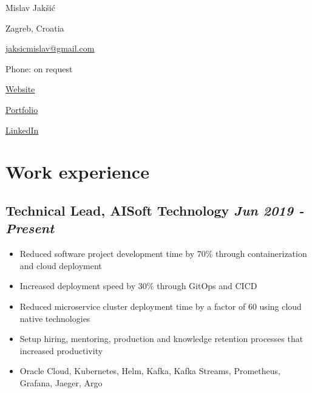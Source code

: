 \documentclass[a4paper]{article}
\newcommand{\bolditalicpair}
[2]
{\textbf{#1} \texorpdfstring{\hfill}{} \textit{#2}}
\begin{document}
\begin{multicols}{3}

\noindent
\begin{minipage}{.22\textwidth}
\raggedright

{\huge Mislav Jakšić}

Zagreb, Croatia
\end{minipage}

\noindent
\begin{minipage}{.50\textwidth}
\raggedleft

\href{mailto:jaksicmislav@gmail.com}{jaksicmislav@gmail.com}

Phone: on request

\end{minipage}

\noindent
\begin{minipage}{.32\textwidth}
\raggedleft

\href{https://mislav-jaksic.from.hr/}{Website}

\href{https://github.com/MislavJaksic}{Portfolio}

\href{https://www.linkedin.com/in/mislav-jaksic}{LinkedIn}

\end{minipage}

\end{multicols}



\section{Work experience}
\subsection{\bolditalicpair{Technical Lead, AISoft Technology}{Jun 2019 - Present}}

\begin{itemize}
  \item Reduced software project development time by 70\% through containerization and cloud deployment
  \item Increased deployment speed by 30\% through GitOps and CICD
  \item Reduced microservice cluster deployment time by a factor of 60 using cloud native technologies
  \item Setup hiring, mentoring, production and knowledge retention processes that increased productivity
  \item Oracle Cloud, Kubernetes, Helm, Kafka, Kafka Streams, Prometheus, Grafana, Jaeger, Argo
\end{itemize}
\end{document}
